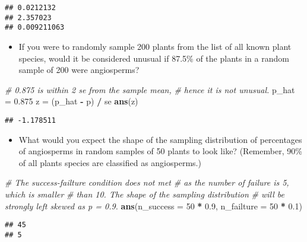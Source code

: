 \documentclass[]{book}
\newenvironment{Shaded}{\begin{snugshade}}{\end{snugshade}}
\newcommand{\CommentTok}[1]{\textcolor[rgb]{0.56,0.35,0.01}{\textit{#1}}}
\newcommand{\DataTypeTok}[1]{\textcolor[rgb]{0.13,0.29,0.53}{#1}}
\newcommand{\DecValTok}[1]{\textcolor[rgb]{0.00,0.00,0.81}{#1}}
\newcommand{\FloatTok}[1]{\textcolor[rgb]{0.00,0.00,0.81}{#1}}
\newcommand{\KeywordTok}[1]{\textcolor[rgb]{0.13,0.29,0.53}{\textbf{#1}}}
\newcommand{\NormalTok}[1]{#1}
\newcommand{\OperatorTok}[1]{\textcolor[rgb]{0.81,0.36,0.00}{\textbf{#1}}}
\newcommand{\StringTok}[1]{\textcolor[rgb]{0.31,0.60,0.02}{#1}}
\providecommand{\tightlist}{%
  \setlength{\itemsep}{0pt}\setlength{\parskip}{0pt}}
\begin{document}
\begin{verbatim}
## 0.0212132
## 2.357023
## 0.009211063
\end{verbatim}

\begin{itemize}
\tightlist
\item
  If you were to randomly sample 200 plants from the list of all known plant species, would it be considered unusual if 87.5\% of the plants in a random sample of 200 were angiosperms?
\end{itemize}

\begin{Shaded}
\begin{Highlighting}[]
\CommentTok{# 0.875 is within 2 se from the sample mean,}
\CommentTok{# hence it is not unusual.}
\NormalTok{p_hat =}\StringTok{ }\FloatTok{0.875}
\NormalTok{z =}\StringTok{ }\NormalTok{(p_hat }\OperatorTok{-}\StringTok{ }\NormalTok{p) }\OperatorTok{/}\StringTok{ }\NormalTok{se}
\KeywordTok{ans}\NormalTok{(z)}
\end{Highlighting}
\end{Shaded}

\begin{verbatim}
## -1.178511
\end{verbatim}

\begin{itemize}
\tightlist
\item
  What would you expect the shape of the sampling distribution of percentages of angiosperms in random samples of 50 plants to look like? (Remember, 90\% of all plants species are classified as angiosperms.)
\end{itemize}

\begin{Shaded}
\begin{Highlighting}[]
\CommentTok{# The success-failture condition does not met}
\CommentTok{# as the number of failure is 5, which is smaller}
\CommentTok{# than 10. The shape of the sampling distribution}
\CommentTok{# will be strongly left skewed as p = 0.9.}
\KeywordTok{ans}\NormalTok{(}\DataTypeTok{n_success =} \DecValTok{50} \OperatorTok{*}\StringTok{ }\FloatTok{0.9}\NormalTok{, }\DataTypeTok{n_failture =} \DecValTok{50} \OperatorTok{*}\StringTok{ }\FloatTok{0.1}\NormalTok{)}
\end{Highlighting}
\end{Shaded}

\begin{verbatim}
## 45
## 5
\end{verbatim}
\end{document}
